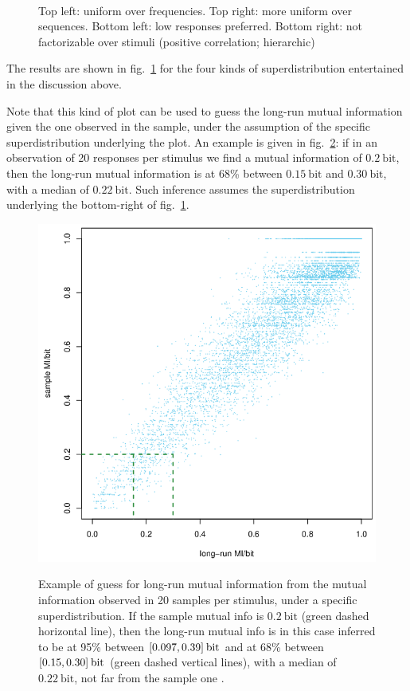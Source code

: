 \documentclass[\ifafour a4paper,12pt,\else a5paper,10pt,\fi%
onecolumn,oneside,article,%
british%
]{memoir}
\theoremstyle{remark}
\theoremstyle{innote}
\DeclarePairedDelimiter\clcl{[}{]}
\renewcommand*{\|}[1][]{\nonscript\,#1\vert\nonscript\;\mathopen{}}
\newcommand*{\fig}{fig.}%
\newcommand*{\bit}{\mathrm{bit}}
\begin{document}
\begin{figure}[p]
\\%
\caption{Top left: uniform over frequencies. Top right: more uniform over
  sequences. Bottom left: low responses preferred. Bottom right: not
  factorizable over stimuli (positive correlation;
  hierarchic)}\label{fig:superdistributions}
\end{figure}%
The results are shown in \fig~\ref{fig:superdistributions} for the four
kinds of superdistribution entertained in the discussion above.

Note that this kind of plot can be used to guess the long-run mutual
information given the one observed in the sample, under the assumption of
the specific superdistribution underlying the plot. An example is given in
\fig~\ref{fig:backward}: if in an observation of 20 responses per stimulus
we find a mutual information of $0.2\:\bit$, then the long-run mutual
information is at 68\% between $0.15\:\bit$ and $0.30\:\bit$, with a median
of $0.22\:\bit$. Such inference assumes the superdistribution underlying
the bottom-right of \fig~\ref{fig:superdistributions}.
\begin{figure}[bt!]%
\centering\includegraphics[width=\linewidth]{scripts/scatter_backward.png}%
\\%
\caption{Example of guess for long-run mutual information from the mutual
  information observed in 20 samples per stimulus, under a specific
  superdistribution. If the sample mutual info is $0.2\:\bit$ (green dashed
  horizontal line), then the long-run mutual info is in this case inferred
  to be at 95\% between $\clcl{0.097, 0.39}\:\bit$ and at 68\% between
  $\clcl{0.15, 0.30}\:\bit$ (green dashed vertical lines), with a median of
  $0.22\:\bit$, not far from the sample one \parencite[compare with the
  different conclusions in][Fig.~1A]{panzerietal2007}.}\label{fig:backward}
\end{figure}%
\end{document}
